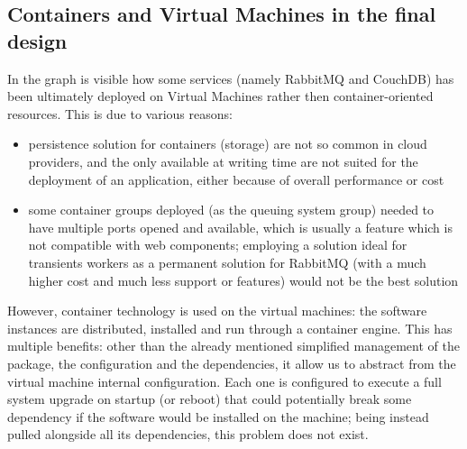 \subsection{Containers and Virtual Machines in the final design}
  In the graph is visible how some services (namely RabbitMQ and CouchDB) has been ultimately deployed on Virtual Machines rather then container-oriented resources. This is due to various reasons:
  \begin{itemize}
    \item persistence solution for containers (storage) are not so common in cloud providers, and the only available at writing time are not suited for the deployment of an application, either because of overall performance or cost
    \item some container groups deployed (as the queuing system group) needed to have multiple ports opened and available, which is usually a feature which is not compatible with web components; employing a solution ideal for transients workers as a permanent solution for RabbitMQ (with a much higher cost and much less support or features) would not be the best solution
  \end{itemize}
  However, container technology is used on the virtual machines: the software instances are distributed, installed and run through a container engine. This has multiple benefits: other than the already mentioned simplified management of the package, the configuration and the dependencies, it allow us to abstract from the virtual machine internal configuration. Each one is configured to execute a full system upgrade on startup (or reboot) that could potentially break some dependency if the software would be installed on the machine; being instead pulled alongside all its dependencies, this problem does not exist.
